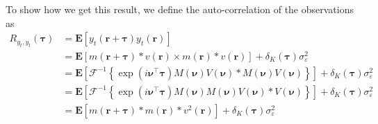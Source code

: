 \documentclass[review,authoryear,3p]{elsarticle}
\begin{document}
To show how we get this result, we define the auto-correlation of the observations as
\begin{align}
	R_{y_{t},y_{t}}(\boldsymbol{\tau}) &= \mathbf{E}\left[y_{t}\left(\mathbf{r}+\boldsymbol{\tau}\right)y_{t}\left(\mathbf{r}\right)\right]\\
	&= \mathbf{E}\left[m(\mathbf{r} + \boldsymbol{\tau}) \ast v(\mathbf{r}) \times m(\mathbf{r}) \ast v(\mathbf{r})\right] + \delta_K(\boldsymbol{\tau})\sigma_{\varepsilon}^2 \\
	&= \mathbf{E}\left[\mathcal{F}^{-1}\left\{ \exp(i\boldsymbol{\nu}^{\top}\boldsymbol{\tau})M(\boldsymbol{\nu})V(\boldsymbol{\nu}) \ast M(\boldsymbol{\nu})V(\boldsymbol{\nu}) \right\}\right] + \delta_K(\boldsymbol{\tau})\sigma_{\varepsilon}^2 \\
	&= \mathbf{E}\left[\mathcal{F}^{-1}\left\{ \exp(i\boldsymbol{\nu}^{\top}\boldsymbol{\tau})M(\boldsymbol{\nu})M(\boldsymbol{\nu})V(\boldsymbol{\nu}) \ast V(\boldsymbol{\nu}) \right\}\right] + \delta_K(\boldsymbol{\tau})\sigma_{\varepsilon}^2 \\
	&= \mathbf{E}\left[m(\mathbf{r}+\boldsymbol{\tau}) \ast m(\mathbf{r}) \ast v^2(\mathbf{r})\right] + \delta_K(\boldsymbol{\tau})\sigma_{\varepsilon}^2
\end{align}
\end{document}

